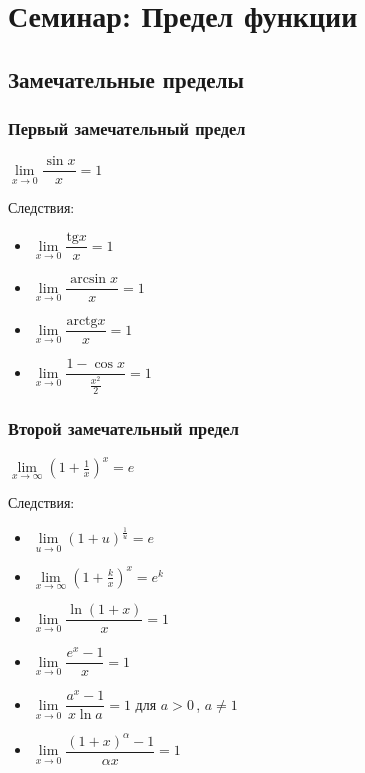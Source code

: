 \section{Семинар: Предел функции}

\subsection{Замечательные пределы}

\subsubsection{Первый замечательный предел}

$\lim\limits_{x \to 0}\dfrac{\sin x}{x} = 1$


Следствия:

\begin{itemize}
\item 
$\lim\limits_{x \to 0}\dfrac{\mathrm{tg} x}{x} = 1$

\item 
$\lim\limits_{x \to 0}\dfrac{\arcsin x}{x} = 1$

\item 
$\lim\limits_{x \to 0}\dfrac{\mathrm{arctg} x}{x} = 1$

\item 
$\lim\limits_{x \to 0}\dfrac{1 - \cos x}{ \frac{x^2}{2} } = 1$
\end{itemize}

\subsubsection{Второй замечательный предел}

$\lim\limits_{x \to \infty}\left(1 + \frac{1}{x}\right)^x = e$

Следствия:

\begin{itemize}
\item 
$\lim\limits_{u \to 0}(1 + u)^\frac{1}{u}=e$

\item 
$\lim\limits_{x \to \infty}\left(1 + \frac{k}{x}\right)^x = e^k$

\item 
$\lim\limits_{x \to 0}\dfrac{\ln(1 + x)}{x} = 1$

\item 
$\lim\limits_{x \to 0}\dfrac{e^x - 1}{x} = 1$

\item 
$\lim\limits_{x \to 0}\dfrac{a^x - 1}{x \ln a} = 1$ для $a > 0 \,\!$, $a \neq 1 \,\!$

\item 
$\lim\limits_{x \to 0}\dfrac{(1 + x)^\alpha - 1}{\alpha x} = 1$

\end{itemize}

